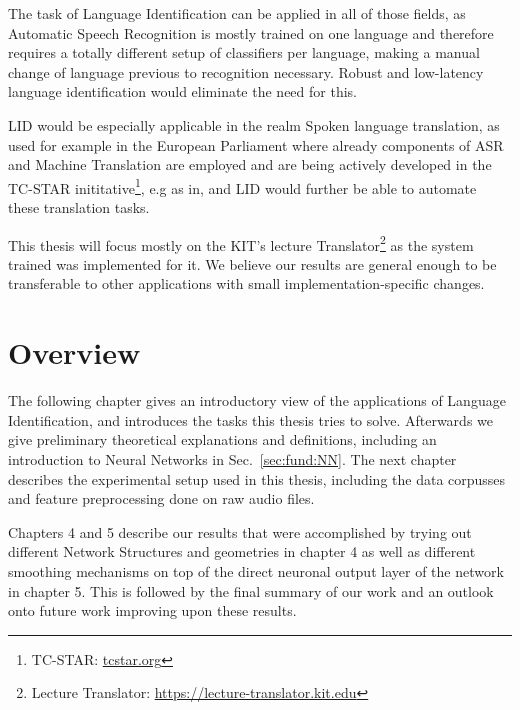 The task of Language Identification can be applied in all of those fields, as Automatic Speech Recognition is mostly trained on one language and therefore requires a totally different setup of classifiers per language, making a manual change of language previous to recognition necessary. Robust and low-latency language identification would eliminate the need for this.

LID would be especially applicable in the realm Spoken language translation, as used for example in the European Parliament where already components of ASR and Machine Translation are employed and are being actively developed in the TC-STAR inititative\footnote{TC-STAR: \url{tcstar.org}}, e.g as in\cite{vilar2005statistical}, and LID would further be able to automate these translation tasks.

This thesis will focus mostly on the KIT's lecture Translator\footnote{Lecture Translator: \url{https://lecture-translator.kit.edu}}  as the system trained was implemented for it. We believe our results are general enough to be transferable to other applications with small implementation-specific changes.

\section{Overview}
\label{sec:Intro:Overview}

The following chapter gives an introductory view of the applications of Language Identification, and introduces the tasks this thesis tries to solve. Afterwards we give preliminary theoretical explanations and definitions, including an introduction to Neural Networks in Sec.~\ref{sec:fund:NN}. The next chapter describes the experimental setup used in this thesis, including the data corpusses and feature preprocessing done on raw audio files. 

Chapters 4 and 5 describe our results that were accomplished by trying out different Network Structures and geometries in chapter 4 as well as different smoothing mechanisms on top of the direct neuronal output layer of the network in chapter 5. This is followed by the final summary of our work and an outlook onto future work improving upon these results.